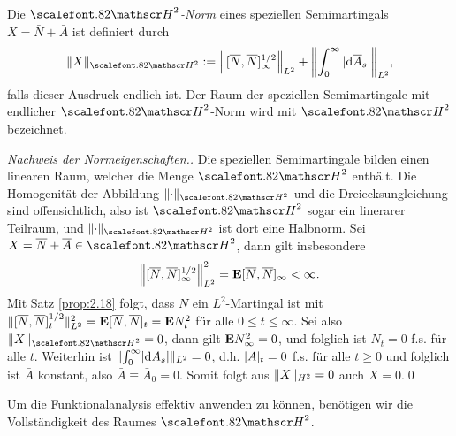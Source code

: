 \begin{definition}
\label{defn:4.1}
Die \emph{$\cH^2$-Norm} eines speziellen Semimartingals
$X=\bar{N}+\bar{A}$ ist definiert durch
\begin{align*}
\norm{X}_{\cH^2} \defl \norm*{[\overline{N},\overline{N}]_\infty^{1/2}}_{L^2}
+
\norm*{\int_0^\infty |\diffd\overline{A}_s|}_{L^2},
\end{align*}
falls dieser Ausdruck endlich
ist. Der Raum der speziellen Semimartingale mit endlicher $\cH^2$-Norm wird
mit \emph{$\cH^2$} bezeichnet.\fish
\end{definition}
\begin{proof}[Nachweis der Normeigenschaften.]
Die speziellen Semimartingale bilden einen linearen Raum, welcher die
Menge $\HH^2$ enthält. Die Homogenität der Abbildung $\norm{\cdot}_{\cH^2}$ und
die Dreiecksungleichung sind offensichtlich, also ist $\HH^2$ sogar ein
linerarer Teilraum, und $\norm{\cdot}_{\cH^2}$ ist dort eine Halbnorm. Sei
$X=\bar{N}+\bar{A}\in\HH^2$, dann gilt insbesondere
\begin{align*}
\norm*{[\overline{N},\overline{N}]_\infty^{1/2}}_{L^2}^2 = 
\E [\overline{N},\overline{N}]_\infty < \infty.
\end{align*}
Mit Satz \ref{prop:2.18} folgt, dass $N$ ein $L^2$-Martingal ist mit
$\norm{[\overline{N},\overline{N}]_t^{1/2}}_{L^2}^2 = \E
[\overline{N},\overline{N}]_t = \E N_t^2$ für alle $0\le t \le \infty$.
Sei also $\norm{X}_{\HH^2} = 0$, dann gilt $\E
N_\infty^2 = 0$, und folglich ist $N_t= 0$ f.s. für alle $t$. Weiterhin ist
$\norm{\int_0^\infty \abs{\dA_s}}_{L^2} = 0$, d.h. $\abs{A}_t = 0$ f.s. für alle
$t \ge 0$ und folglich ist $\bar{A}$ konstant, also $\bar{A} \equiv \bar{A}_0 =
0$.
Somit folgt aus $\norm{X}_{H^2} = 0$ auch $X = 0$.\qed
\end{proof}

Um die Funktionalanalysis effektiv anwenden zu können, benötigen wir die
Vollständigkeit des Raumes $\cH^2$.

